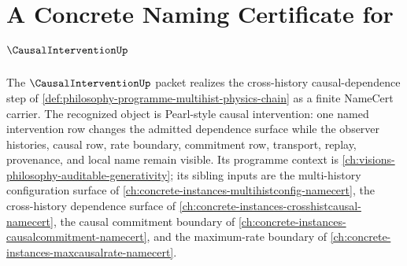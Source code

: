 \chapter{A Concrete Naming Certificate for $\CausalInterventionUp$}
\label{ch:concrete-instances-causal-intervention-namecert}

The $\CausalInterventionUp$ packet realizes the cross-history causal-dependence step of \autoref{def:philosophy-programme-multihist-physics-chain} as a finite NameCert carrier. The recognized object is Pearl-style causal intervention: one named intervention row changes the admitted dependence surface while the observer histories, causal row, rate boundary, commitment row, transport, replay, provenance, and local name remain visible. Its programme context is \autoref{ch:visions-philosophy-auditable-generativity}; its sibling inputs are the multi-history configuration surface of \autoref{ch:concrete-instances-multihistconfig-namecert}, the cross-history dependence surface of \autoref{ch:concrete-instances-crosshistcausal-namecert}, the causal commitment boundary of \autoref{ch:concrete-instances-causalcommitment-namecert}, and the maximum-rate boundary of \autoref{ch:concrete-instances-maxcausalrate-namecert}.

